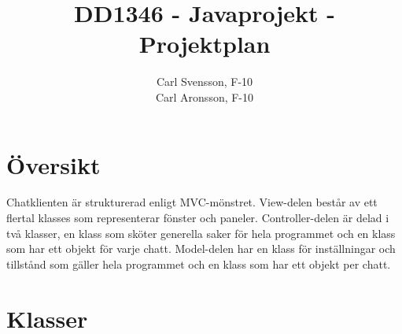 \documentclass{article}
\title{DD1346 - Javaprojekt - Projektplan}
\author{Carl Svensson, F-10 \\ Carl Aronsson, F-10}
\begin{document}
\maketitle

\section{Översikt}

Chatklienten är strukturerad enligt MVC-mönstret. View-delen består av ett flertal klasses som representerar fönster och paneler.
Controller-delen är delad i två klasser, en klass som sköter generella saker för hela programmet och en klass som har ett objekt för varje chatt.
Model-delen har en klass för inställningar och tillstånd som gäller hela programmet och en klass som har ett objekt per chatt.

\section{Klasser}
\end{document}
